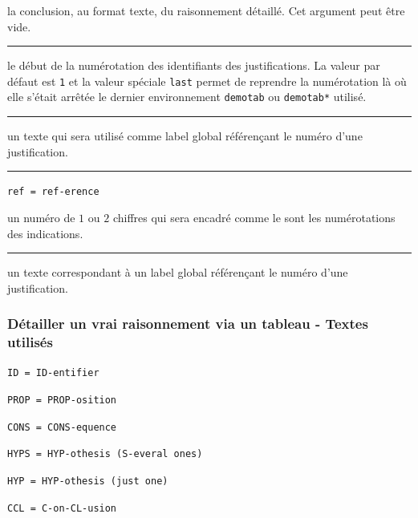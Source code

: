 \documentclass[12pt,a4paper]{article}
\theoremstyle{definition}
\newcommand\env[1]{\texttt{#1}}
\newcommand\separation{
    \medskip
    \hfill\rule{0.5\textwidth}{0.75pt}\hfill
    \medskip
}
\newcommand\extraspace{
    \vspace{0.25em}
}
\newcommand\mwhyprefix[2]{%
    \texttt{#1 = #1-#2}%
}
\newcommand\prefix[1]{%
    \texttt{#1}%
}
\begin{document}
 la conclusion, au format texte, du raisonnement détaillé.
              Cet argument peut être vide.


\separation



 le début de la numérotation des identifiants des justifications.
              La valeur par défaut est \verb+1+ et la valeur spéciale \verb+last+ permet de reprendre la numérotation là où elle s'était arrêtée le dernier environnement \env{demotab} ou \env{demotab*} utilisé.


\separation



\IDoption{} un texte qui sera utilisé comme label global référençant le numéro d'une justification.


\separation


  \hfill \mwhyprefix{ref}{erence}

\IDarg{} un numéro de $1$ ou $2$ chiffres qui sera encadré comme le sont les numérotations des indications.


\separation



\IDarg{} un texte correspondant à un label global référençant le numéro d'une justification.


\subsubsection{Détailler un \og vrai \fg{} raisonnement via un tableau - Textes utilisés}

     \hfill \mwhyprefix{ID}{entifier}


   \hfill \mwhyprefix{PROP}{osition}

   \hfill \mwhyprefix{CONS}{equence}

\extraspace

   \hfill \prefix{HYPS = HYP-othesis (S-everal ones)} 

    \hfill \prefix{HYP = HYP-othesis (just one)}

    \hfill \prefix{CCL = C-on-CL-usion}

\extraspace

\end{document}
